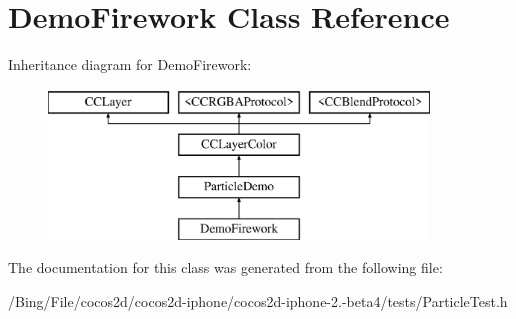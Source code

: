 \hypertarget{interface_demo_firework}{\section{Demo\-Firework Class Reference}
\label{interface_demo_firework}
}
Inheritance diagram for Demo\-Firework\-:\begin{figure}[H]
\begin{center}
\leavevmode
\includegraphics[height=4.000000cm]{interface_demo_firework}
\end{center}
\end{figure}


The documentation for this class was generated from the following file\-:\begin{DoxyCompactItemize}
\item 
/\-Bing/\-File/cocos2d/cocos2d-\/iphone/cocos2d-\/iphone-\/2.-\/beta4/tests/Particle\-Test.\-h\end{DoxyCompactItemize}
